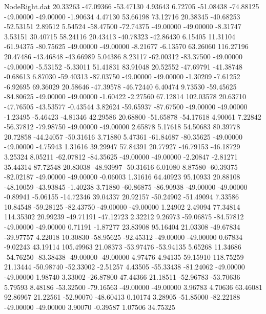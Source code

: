 \begin{filecontents}{NodeRight.dat}
  20.33263  -47.09366  -53.47130     4.93643    6.72705  -51.08438  -74.88125  -49.00000  -49.00000   -1.90634    4.47130   53.66198   73.12716
  20.38345  -40.68253  -52.53151     2.89512    5.54524  -58.47500  -72.74375  -49.00000  -49.00000   -8.31747    3.53151   30.40715   58.24116
  20.43413  -40.78323  -42.86430     6.15405   11.31104  -61.94375  -80.75625  -49.00000  -49.00000   -8.21677   -6.13570   63.26060  116.27196
  20.47486  -43.46848  -43.66989     5.04386    8.23117  -62.00312  -83.37500  -49.00000  -49.00000   -5.53152   -5.33011   51.41831   83.91048
  20.52552  -47.69791  -41.38748    -0.68613    6.87030  -59.40313  -87.03750  -49.00000  -49.00000   -1.30209   -7.61252   -6.92695   69.36029
  20.58646  -47.39578  -46.72440     6.40474    9.73530  -59.45625  -84.80625  -49.00000  -49.00000   -1.60422   -2.27560   67.12814  102.03578
  20.63710  -47.76505  -43.53577    -0.43544    3.82624  -59.65937  -87.67500  -49.00000  -49.00000   -1.23495   -5.46423   -4.81346   42.29586
  20.68800  -51.65878  -54.17618     4.90061    7.22842  -56.37812  -79.98750  -49.00000  -49.00000    2.65878    5.17618   54.50683   80.39778
  20.72858  -44.24057  -50.31616     3.71880    5.47361  -61.84687  -80.35625  -49.00000  -49.00000   -4.75943    1.31616   39.29947   57.84391
  20.77927  -46.79153  -46.18729     3.25324    8.05211  -62.07812  -84.35625  -49.00000  -49.00000   -2.20847   -2.81271   35.44314   87.72548
  20.83038  -48.93997  -50.31616     6.01080    8.87580  -60.39375  -82.02187  -49.00000  -49.00000   -0.06003    1.31616   64.40923   95.10933
  20.88108  -48.10059  -43.93845    -1.40238    3.71880  -60.86875  -86.90938  -49.00000  -49.00000   -0.89941   -5.06155  -14.72346   39.04337
  20.92157  -50.24902  -51.49094     7.33586   10.84548  -59.28125  -82.43750  -49.00000  -49.00000    1.24902    2.49094   77.34814  114.35302
  20.99239  -49.71191  -47.12723     2.32212    9.26973  -59.06875  -84.57812  -49.00000  -49.00000    0.71191   -1.87277   23.83908   95.16404
  21.03308  -49.67834  -39.97757     4.22018   10.30830  -58.95625  -92.45312  -49.00000  -49.00000    0.67834   -9.02243   43.19114  105.49963
  21.08373  -53.97476  -53.94135     5.65268   11.34686  -54.76250  -83.38438  -49.00000  -49.00000    4.97476    4.94135   59.15910  118.75259
  21.13444  -50.98740  -52.33002    -2.51257    4.43505  -55.33438  -81.24062  -49.00000  -49.00000    1.98740    3.33002  -26.87800   47.44366
  21.18511  -52.96783  -53.70636     5.79593    8.48186  -53.32500  -79.16563  -49.00000  -49.00000    3.96783    4.70636   63.46081   92.86967
  21.22561  -52.90070  -48.60413     0.10174    3.28905  -51.85000  -82.22188  -49.00000  -49.00000    3.90070   -0.39587    1.07506   34.75325

\end{filecontents}
